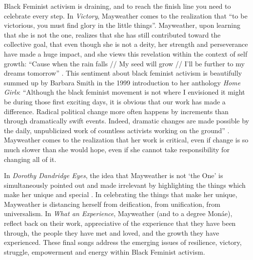 \documentclass[a4paper, 11pt]{article} %
\begin{document}
Black Feminist activism is draining, and to reach the finish line you need to celebrate every step.
In \emph{Victory}, Mayweather comes to the realization that ``to be victorious, you must find glory in the little things''.
Mayweather, upon learning that she is not the one, realizes that she has still contributed toward the collective goal, that even though she is not a deity, her strength and perseverance have made a huge impact, and she views this revelation within the context of self growth: 
 ``Cause when the rain falls // My seed will grow // I'll be further to my dreams tomorrow'' .
 This sentiment about black feminist activism is beautifully summed up by Barbara Smith in the 1999 introduction to her anthology \emph{Home Girls}:
 ``Although the black feminist movement is not where I envisioned it might be during those first exciting days, it is obvious that our work has made a difference. Radical political change more often happens by increments than through dramatically swift events. Indeed, dramatic changes are made possible by the daily, unpublicized work of countless activists working on the ground'' .
 Mayweather comes to the realization that her work is critical, even if change is so much slower than she would hope, even if she cannot take responsibility for changing all of it.
 
 In \emph{Dorothy Dandridge Eyes}, the idea that Mayweather is not `the One' is simultaneously pointed out and made irrelevant by highlighting the things which make her unique and special .
 In celebrating the things that make her unique, Mayweather is distancing herself from deification, from unification, from universalism.
 In \emph{What an Experience}, Mayweather (and to a degree Mon\'ae), reflect back on their work, appreciative of the experience that they have been through, the people they have met and loved, and the growth they have experienced. 
 These final songs address the emerging issues of resilience, victory, struggle, empowerment and energy within Black Feminist activism.

\end{document}
